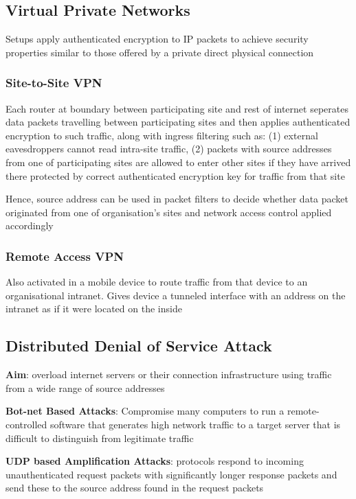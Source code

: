 \documentclass{article}
\begin{document}
\subsection{Virtual Private Networks}
Setups apply authenticated encryption to IP packets to achieve security properties similar to those offered by a private direct physical connection

\subsubsection{Site-to-Site VPN}
Each router at boundary between participating site and rest of internet seperates data packets travelling between participating sites and then applies authenticated encryption to such traffic, along with ingress filtering such as: (1) external eavesdroppers cannot read intra-site traffic, (2) packets with source addresses from one of participating sites are allowed to enter other sites if they have arrived there protected by correct authenticated encryption key for traffic from that site

\bigskip
Hence, source address can be used in packet filters to decide whether data packet originated from one of organisation's sites and network access control applied accordingly

\subsubsection{Remote Access VPN}
Also activated in a mobile device to route traffic from that device to an organisational intranet. Gives device a tunneled interface with an address on the intranet as if it were located on the inside

\subsection{Distributed Denial of Service Attack}
\textbf{Aim}: overload internet servers or their connection infrastructure using traffic from a wide range of source addresses

\bigskip
\textbf{Bot-net Based Attacks}: Compromise many computers to run a remote-controlled software that generates high network traffic to a target server that is difficult to distinguish from legitimate traffic

\bigskip
\textbf{UDP based Amplification Attacks}: protocols respond to incoming unauthenticated request packets with significantly longer response packets and send these to the source address found in the request packets
\end{document}
